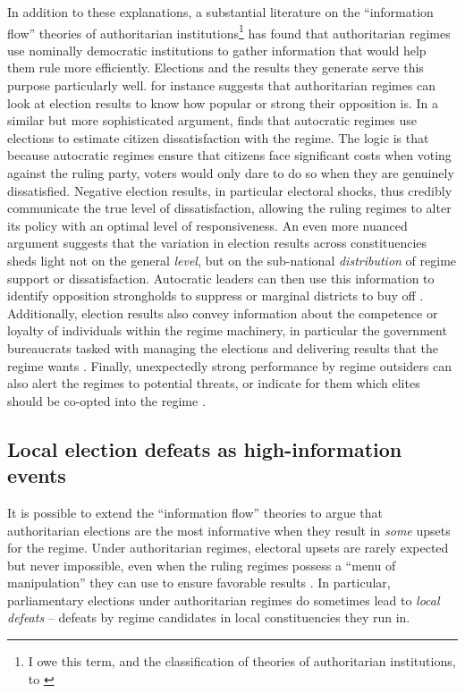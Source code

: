 \documentclass[12pt]{article}\usepackage[]{graphicx}\usepackage[]{color}
\newcommand{\1}{\mathbbm{1}}
\begin{document}
In addition to these explanations, a substantial literature on the ``information flow'' theories of authoritarian institutions\footnote{I owe this term, and the classification of theories of authoritarian institutions, to \cite{Hou2017}} has found that authoritarian regimes use nominally democratic institutions to gather information that would help them rule more efficiently. Elections and the results they generate serve this purpose particularly well. \cite{Geddes2005} for instance suggests that authoritarian regimes can look at election results to know how popular or strong their opposition is. In a similar but more sophisticated argument, \cite{Miller2015} finds that autocratic regimes use elections to estimate citizen dissatisfaction with the regime. The logic is that because autocratic regimes ensure that citizens face significant costs when voting against the ruling party, voters would only dare to do so when they are genuinely dissatisfied. Negative election results, in particular electoral shocks, thus credibly communicate the true level of dissatisfaction, allowing the ruling regimes to alter its policy with an optimal level of responsiveness. An even more nuanced argument suggests that the variation in election results across constituencies sheds light not on the general \textit{level}, but on the sub-national \textit{distribution} of regime support or dissatisfaction. Autocratic leaders can then use this information to identify opposition strongholds to suppress \citep{Magaloni2006, Blaydes2008} or marginal districts to buy off \citep{Reed2001, Magaloni2006}. Additionally, election results also convey information about the competence or loyalty of individuals within the regime machinery, in particular the government bureaucrats tasked with managing the elections and delivering results that the regime wants \citep{Magaloni2006, Blaydes2008}. Finally, unexpectedly strong performance by regime outsiders can also alert the regimes to potential threats, or indicate for them which elites should be co-opted into the regime \cite{LustOkar2005}.

\subsection{Local election defeats as high-information events}
It is possible to extend the ``information flow'' theories to argue that authoritarian elections are the most informative when they result in \textit{some} upsets for the regime. Under authoritarian regimes, electoral upsets are rarely expected but never impossible, even when the ruling regimes possess a ``menu of manipulation'' they can use to ensure favorable results \citep{Schedler2002Menu}. In particular, parliamentary elections under authoritarian regimes do sometimes lead to \textit{local defeats} -- defeats by regime candidates in local constituencies they run in. 
\end{document}
